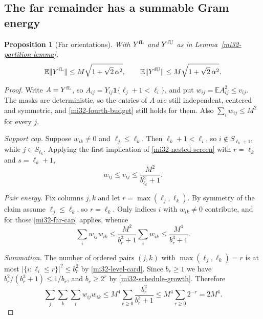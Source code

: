 \documentclass[11pt]{article}
\newtheorem{proposition}[theorem]{Proposition}
\theoremstyle{definition}
\theoremstyle{remark}
\newcommand{\E}{\mathbb E}
\newcommand{\norm}[1]{\lVert#1\rVert}
\begin{document}
\subsection{The far remainder has a summable Gram energy}
\label{mi32-far-remainder}

\begin{proposition}[Far orientations]
\label{mi32-far-proposition}
With $Y^{\rm fL}$ and $Y^{\rm fU}$ as in
Lemma~\ref{mi32-partition-lemma},
\begin{equation}\label{mi32-far-bound}
 \E\norm{Y^{\rm fL}}\le M\sqrt{1+\sqrt2\,\alpha^2},
 \qquad
 \E\norm{Y^{\rm fU}}\le M\sqrt{1+\sqrt2\,\alpha^2}.
\end{equation}
\end{proposition}
\begin{proof}
Write $A=Y^{\rm fL}$, so $A_{ij}=Y_{ij}\mathbf1\{\ell_j+1<\ell_i\}$,
and put $w_{ij}=\E A_{ij}^2\le v_{ij}$. The masks are deterministic, so
the entries of $A$ are still independent, centered and symmetric, and
\eqref{mi32-fourth-budget} still holds for them. Also
$\sum_iw_{ij}\le M^2$ for every $j$.

\emph{Support cap.} Suppose $w_{ik}\ne0$ and $\ell_j\le\ell_k$. Then
$\ell_k+1<\ell_i$, so $i\notin S_{\ell_k+1}$, while $j\in
S_{\ell_k}$. Applying the first implication of
\eqref{mi32-nested-screen} with $r=\ell_k$ and $s=\ell_k+1$,
\begin{equation}\label{mi32-far-cap}
 w_{ij}\le v_{ij}\le\frac{M^2}{b_{\ell_k}^3+1}.
\end{equation}

\emph{Pair energy.} Fix columns $j,k$ and let $r=\max(\ell_j,\ell_k)$.
By symmetry of the claim assume $\ell_j\le\ell_k$, so $r=\ell_k$. Only
indices $i$ with $w_{ik}\ne0$ contribute, and for those
\eqref{mi32-far-cap} applies, whence
\begin{equation}\label{mi32-far-pair}
 \sum_iw_{ij}w_{ik}
 \le\frac{M^2}{b_r^3+1}\sum_iw_{ik}
 \le\frac{M^4}{b_r^3+1}.
\end{equation}

\emph{Summation.} The number of ordered pairs $(j,k)$ with
$\max(\ell_j,\ell_k)=r$ is at most $|\{i:\ell_i\le r\}|^2\le b_r^2$ by
\eqref{mi32-level-card}. Since $b_r\ge1$ we have
$b_r^2/(b_r^3+1)\le1/b_r$, and $b_r\ge2^r$ by
\eqref{mi32-schedule-growth}. Therefore
\begin{equation}\label{mi32-far-total}
 \sum_j\sum_k\sum_iw_{ij}w_{ik}
 \le M^4\sum_{r\ge0}\frac{b_r^2}{b_r^3+1}
 \le M^4\sum_{r\ge0}2^{-r}
 =2M^4 .
\end{equation}


\end{proof}
\end{document}
